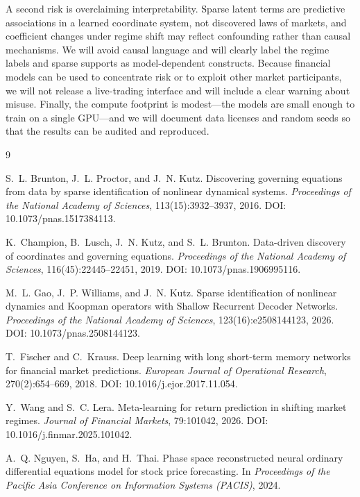 \documentclass{article}
\begin{document}
A second risk is overclaiming interpretability. Sparse latent terms are predictive associations in a learned coordinate system, not discovered laws of markets, and coefficient changes under regime shift may reflect confounding rather than causal mechanisms. We will avoid causal language and will clearly label the regime labels and sparse supports as model-dependent constructs. Because financial models can be used to concentrate risk or to exploit other market participants, we will not release a live-trading interface and will include a clear warning about misuse. Finally, the compute footprint is modest---the models are small enough to train on a single GPU---and we will document data licenses and random seeds so that the results can be audited and reproduced.

\begin{thebibliography}{9}
\small

S.~L. Brunton, J.~L. Proctor, and J.~N. Kutz.
\newblock Discovering governing equations from data by sparse identification of nonlinear dynamical systems.
\newblock \emph{Proceedings of the National Academy of Sciences}, 113(15):3932--3937, 2016.
\newblock DOI: 10.1073/pnas.1517384113.

K.~Champion, B.~Lusch, J.~N. Kutz, and S.~L. Brunton.
\newblock Data-driven discovery of coordinates and governing equations.
\newblock \emph{Proceedings of the National Academy of Sciences}, 116(45):22445--22451, 2019.
\newblock DOI: 10.1073/pnas.1906995116.

M.~L. Gao, J.~P. Williams, and J.~N. Kutz.
\newblock Sparse identification of nonlinear dynamics and Koopman operators with Shallow Recurrent Decoder Networks.
\newblock \emph{Proceedings of the National Academy of Sciences}, 123(16):e2508144123, 2026.
\newblock DOI: 10.1073/pnas.2508144123.

T.~Fischer and C.~Krauss.
\newblock Deep learning with long short-term memory networks for financial market predictions.
\newblock \emph{European Journal of Operational Research}, 270(2):654--669, 2018.
\newblock DOI: 10.1016/j.ejor.2017.11.054.

Y.~Wang and S.~C. Lera.
\newblock Meta-learning for return prediction in shifting market regimes.
\newblock \emph{Journal of Financial Markets}, 79:101042, 2026.
\newblock DOI: 10.1016/j.finmar.2025.101042.

A.~Q. Nguyen, S.~Ha, and H.~Thai.
\newblock Phase space reconstructed neural ordinary differential equations model for stock price forecasting.
\newblock In \emph{Proceedings of the Pacific Asia Conference on Information Systems (PACIS)}, 2024.

\end{thebibliography}
\end{document}
